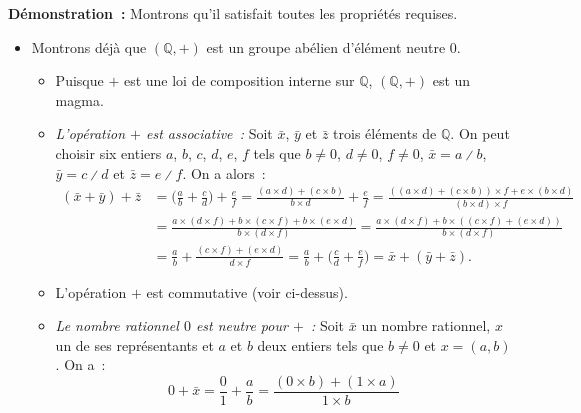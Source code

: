 \noindent\textbf{Démonstration :} Montrons qu'il satisfait toutes les propriétés requises.
\begin{itemize}[nosep]
    \item Montrons déjà que $(\mathbb{Q}, +)$ est un groupe abélien d'élément neutre $0$.
        \begin{itemize}[nosep]
            \item Puisque $+$ est une loi de composition interne sur $\mathbb{Q}$, $(\mathbb{Q}, +)$ est un magma.
            \item \emph{L'opération $+$ est associative :} 
                Soit $\bar{x}$, $\bar{y}$ et $\bar{z}$ trois éléments de $\mathbb{Q}$. 
                On peut choisir six entiers $a$, $b$, $c$, $d$, $e$, $f$ tels que $b \neq 0$, $d \neq 0$, $f \neq 0$, $\bar{x} = a \divslash b$, $\bar{y} = c \divslash d$ et $\bar{z} = e \divslash f$.
                On a alors : 
                \begin{equation*} \begin{aligned}
                    (\bar{x} + \bar{y}) + \bar{z} 
                    & = \Big( \frac{a}{b} + \frac{c}{d} \Big) + \frac{e}{f}
                    = \frac{(a \times d) + (c \times b)}{b \times d} + \frac{e}{f}
                    = \frac{((a \times d) + (c \times b)) \times f + e \times (b \times d)}{(b \times d) \times f} \\
                    & = \frac{a \times (d \times f) + b \times (c \times f) + b \times (e \times d)}{b \times (d \times f)} 
                    = \frac{a \times (d \times f) + b \times ((c \times f) + (e \times d))}{b \times (d \times f)} \\
                    & = \frac{a}{b} + \frac{(c \times f) + (e \times d)}{d \times f} 
                    = \frac{a}{b} + \Big( \frac{c}{d} + \frac{e}{f} \Big)
                    = \bar{x} + (\bar{y} + \bar{z}) .
                \end{aligned} \end{equation*}
            \item L'opération $+$ est commutative (voir ci-dessus).
            \item \emph{Le nombre rationnel $0$ est neutre pour $+$ :} 
                Soit $\bar{x}$ un nombre rationnel, $x$ un de ses représentants et $a$ et $b$ deux entiers tels que $b \neq 0$ et $x = (a, b)$. 
                On a : 
                \begin{equation*}
                    0 + \bar{x} = \frac{0}{1} + \frac{a}{b}
                        = \frac{(0 \times b) + (1 \times a)}{1 \times b}

\end{equation*}
\end{itemize}
\end{itemize}
